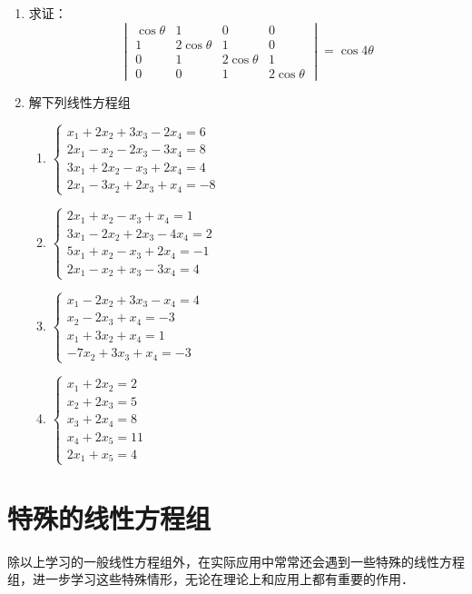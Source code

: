 \begin{enumerate}
\item 求证：
\[\begin{vmatrix}
\cos\theta & 1&0&0\\
1&2\cos\theta&1&0\\
0&1&2\cos\theta&1\\
0&0&1&2\cos\theta    
\end{vmatrix}=\cos4\theta\]

\item 解下列线性方程组
\begin{multicols}{2}
    \begin{enumerate}
    \item $\begin{cases}
 x_1+2x_2+3x_3-2x_4=6\\
 2x_1-x_2-2x_3-3x_4=8\\
 3x_1+2x_2-x_3+2x_4=4\\
 2x_1-3x_2+2x_3+x_4=-8       
    \end{cases}$
    \item $\begin{cases}
2x_1+x_2-x_3+x_4=1\\
3x_1-2x_2+2x_3-4x_4=2\\
5x_1+x_2-x_3+2x_4=-1\\
2x_1-x_2+x_3-3x_4=4        
    \end{cases}$
    \item $\begin{cases}
 x_1-2x_2+3x_3-x_4=4\\
 x_2-2x_3+x_4=-3\\
 x_1+3x_2+x_4=1\\
 -7x_2+3x_3+x_4=-3       
    \end{cases}$
    \item $\begin{cases}
x_1+2x_2=2\\
x_2+2x_3=5\\
x_3+2x_4=8\\
x_4+2x_5=11\\
2x_1+x_5=4    
    \end{cases}$
\end{enumerate}
\end{multicols}

\end{enumerate}

\section{特殊的线性方程组}
除以上学习的一般线性方程组外，在实际应用中常常还会遇到一些特殊的线性方程组，进一步学习这些特殊情形，无论在理论上和应用上都有重要的作用．

